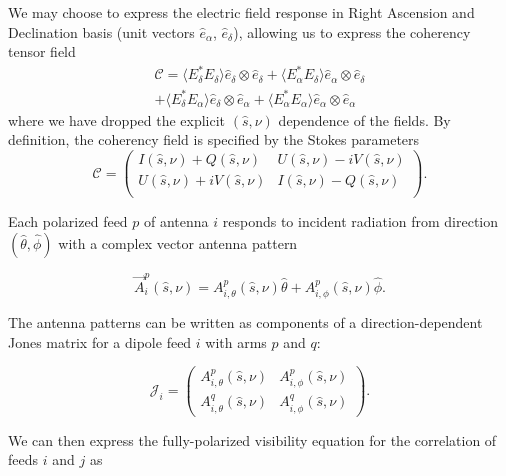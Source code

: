 \documentclass[twocolumn, trackchanges]{aastex61}
\begin{document}
We may choose to express the electric field response in Right Ascension and Declination basis (unit vectors $\hat{e}_{\alpha}$, $\hat{e}_{\delta}$), allowing us to express the coherency tensor field
\begin{multline}
\mathcal{C} =  \langle E_{\delta}^* E_{\delta} \rangle \hat{e}_{\delta} \otimes \hat{e}_{\delta} 
					+  \langle E_{\alpha}^* E_{\delta} \rangle \hat{e}_{\alpha} \otimes \hat{e}_{\delta} \\
					+  \langle E_{\delta}^* E_{\alpha} \rangle \hat{e}_{\delta} \otimes \hat{e}_{\alpha}
					+  \langle E_{\alpha}^* E_{\alpha} \rangle \hat{e}_{\alpha} \otimes \hat{e}_{\alpha} 
\end{multline}
where we have dropped the explicit $(\hat{s}, \nu)$ dependence of the fields.  By definition, the coherency field is specified by the Stokes parameters
\begin{equation}
\mathcal{C} = \begin{pmatrix}
I(\hat{s}, \nu) + Q(\hat{s}, \nu) & U(\hat{s}, \nu) - iV(\hat{s}, \nu) \\
U(\hat{s}, \nu) + iV(\hat{s}, \nu) & I(\hat{s}, \nu) - Q(\hat{s}, \nu) \\
\end{pmatrix}.
\end{equation}

Each polarized feed $p$ of antenna $i$ responds to incident radiation from direction $(\hat{\theta},\hat{\phi})$ with a complex vector antenna pattern

\begin{equation}
\vec{A}^p_i(\hat{s},\nu) = A_{i,\theta}^p(\hat{s},\nu)\hat{\theta} + A_{i,\phi}^p(\hat{s},\nu)\hat{\phi}.
\end{equation}

The antenna patterns can be written as components of a direction-dependent Jones matrix for a dipole feed $i$ with arms $p$ and $q$:

\begin{equation}
\mathcal{J}_i = 
\begin{pmatrix}
A_{i,\theta}^p(\hat{s},\nu) & A_{i,\phi}^p(\hat{s},\nu) \\
A_{i,\theta}^q(\hat{s},\nu) & A_{i,\phi}^q(\hat{s},\nu)
\end{pmatrix}.
\end{equation}

We can then express the fully-polarized visibility equation for the correlation of feeds $i$ and $j$ as 
\end{document}
